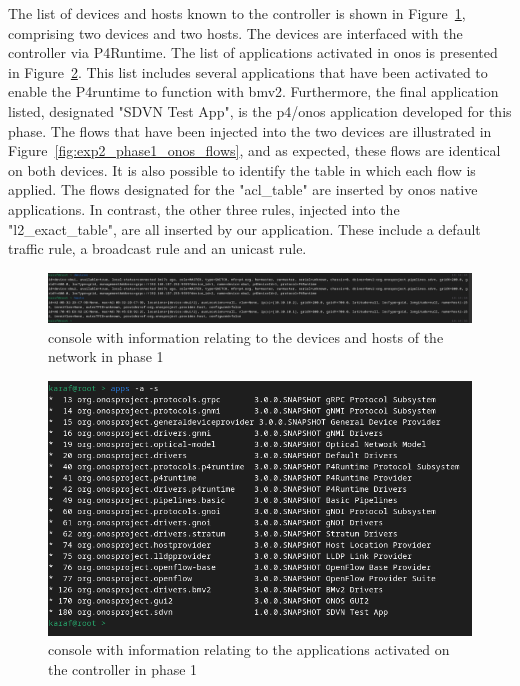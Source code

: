 The list of devices and hosts known to the controller is shown in Figure~\ref{fig:exp2_phase1_onos}, comprising two devices and two hosts. The devices are interfaced with the controller via P4Runtime. The list of applications activated in \gls{onos} is presented in Figure~\ref{fig:exp2_phase1_onos_apps}. This list includes several applications that have been activated to enable the P4runtime to function with \gls{bmv2}. Furthermore, the final application listed, designated "SDVN Test App", is the \gls{p4}/\gls{onos} application developed for this phase.
The flows that have been injected into the two devices are illustrated in Figure~\ref{fig:exp2_phase1_onos_flows}, and as expected, these flows are identical on both devices.
It is also possible to identify the table in which each flow is applied. The flows designated for the "acl\_table" are inserted by \gls{onos} native applications. In contrast, the other three rules, injected into the "l2\_exact\_table", are all inserted by our application. These include a default traffic rule, a broadcast rule and an unicast rule.

\begin{figure}
	\centering
	\includegraphics[width=\textwidth]{Chapters/Figures/tests/bmv2_phase_1/onos_topology.PNG}
	\caption{ console with information relating to the devices and hosts of the network in phase 1}
	\label{fig:exp2_phase1_onos}
\end{figure}

\begin{figure}
	\centering
	\includegraphics[width=\textwidth]{Chapters/Figures/tests/bmv2_phase_1/onos_apps.PNG}
	\caption{ console with information relating to the applications activated on the controller in phase 1}
	\label{fig:exp2_phase1_onos_apps}
\end{figure}

